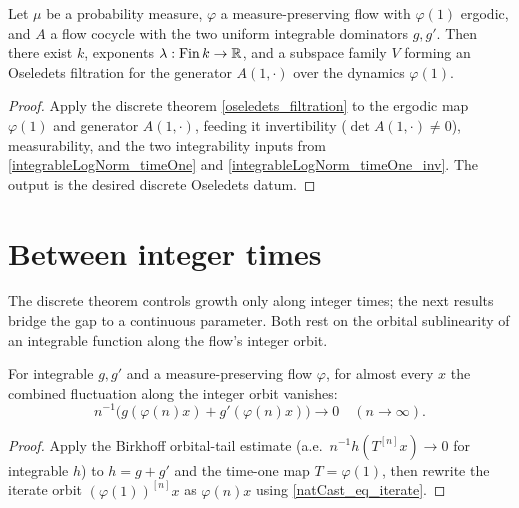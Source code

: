 \begin{proposition}\label{exists_isOseledetsFiltration_timeOne}
  \leanok
  Let \( \mu \) be a probability measure, \( \varphi \) a measure-preserving flow with
  \( \varphi(1) \) ergodic, and \( A \) a flow cocycle with the two uniform integrable
  dominators \( g, g' \). Then there exist \( k \), exponents \( \lambda : \mathrm{Fin}\,k \to \mathbb{R} \),
  and a subspace family \( V \) forming an Oseledets filtration for the generator \( A(1,\cdot) \)
  over the dynamics \( \varphi(1) \).
\end{proposition}
\begin{proof}\leanok
  Apply the discrete theorem \ref{oseledets_filtration} to the ergodic map \( \varphi(1) \) and
  generator \( A(1,\cdot) \), feeding it invertibility (\( \det A(1,\cdot) \ne 0 \)),
  measurability, and the two integrability inputs from \ref{integrableLogNorm_timeOne} and
  \ref{integrableLogNorm_timeOne_inv}. The output is the desired discrete Oseledets datum.
\end{proof}

\section{Between integer times}

The discrete theorem controls growth only along integer times; the next results bridge the gap
to a continuous parameter. Both rest on the orbital sublinearity of an integrable function along
the flow's integer orbit.

\begin{lemma}\label{ae_tendsto_flowError_zero}
  \leanok
  For integrable \( g, g' \) and a measure-preserving flow \( \varphi \), for almost every
  \( x \) the combined fluctuation along the integer orbit vanishes:
  \[ n^{-1}\bigl(g(\varphi(n)x) + g'(\varphi(n)x)\bigr) \to 0 \quad (n \to \infty). \]
\end{lemma}
\begin{proof}\leanok
  Apply the Birkhoff orbital-tail estimate (a.e.\ \( n^{-1} h(T^{[n]}x) \to 0 \) for integrable
  \( h \)) to \( h = g + g' \) and the time-one map \( T = \varphi(1) \), then rewrite the
  iterate orbit \( (\varphi(1))^{[n]}x \) as \( \varphi(n)x \) using \ref{natCast_eq_iterate}.
\end{proof}

